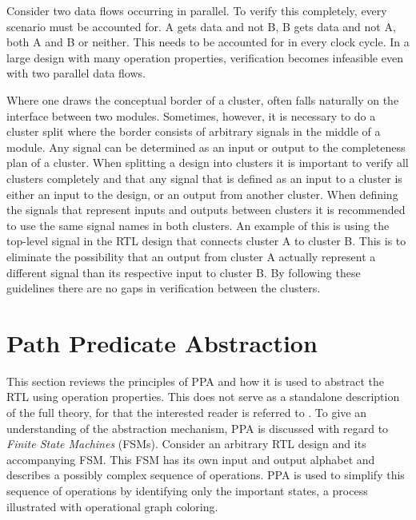 Consider two data flows occurring in parallel. To verify this completely, every scenario must be accounted for. A gets data and not B, B gets data and not A, both A and B or neither. This needs to be accounted for in every clock cycle. In a large design with many operation properties, verification becomes infeasible even with two parallel data flows.     


Where one draws the conceptual border of a cluster, often falls naturally on the interface between two modules. Sometimes, however, it is necessary to do a cluster split where the border consists of arbitrary signals in the middle of a module. Any signal can be determined as an input or output to the completeness plan of a cluster\cite{clust}. When splitting a design into clusters it is important to verify all clusters completely and that any signal that is defined as an input to a cluster is either an input to the design, or an output from another cluster. When defining the signals that represent inputs and outputs between clusters it is recommended to use the same signal names in both clusters. An example of this is using the top-level signal in the RTL design that connects cluster A to cluster B. This is to eliminate the possibility that an output from cluster A actually represent a different signal than its respective input to cluster B. By following these guidelines there are no gaps in verification between the clusters. 



\section{Path Predicate Abstraction}
\label{sec:ppa}

This section reviews the principles of PPA and how it is used to abstract the RTL using operation properties. This does not serve as a standalone description of the full theory, for that the interested reader is referred to \cite{2014-UrdahlStoffel.etal}. To give an understanding of the abstraction mechanism, PPA is discussed with regard to \textit{Finite State Machines} (FSMs). 
Consider an arbitrary RTL design and its accompanying FSM. This FSM has its own input and output alphabet and describes a possibly complex sequence of operations. PPA is used to simplify this sequence of operations by identifying only the important states, a process illustrated with operational graph coloring. \\ 

